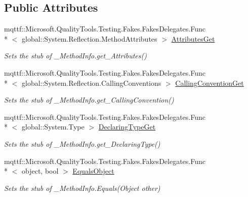 \subsection*{Public Attributes}
\begin{DoxyCompactItemize}
\item 
mqttf\-::\-Microsoft.\-Quality\-Tools.\-Testing.\-Fakes.\-Fakes\-Delegates.\-Func\\*
$<$ global\-::\-System.\-Reflection.\-Method\-Attributes $>$ \hyperlink{class_system_1_1_runtime_1_1_interop_services_1_1_fakes_1_1_stub___method_info_a2adbb44739c05931cddff21cc3cf0a2f}{Attributes\-Get}
\begin{DoxyCompactList}\small\item\em Sets the stub of \-\_\-\-Method\-Info.\-get\-\_\-\-Attributes()\end{DoxyCompactList}\item 
mqttf\-::\-Microsoft.\-Quality\-Tools.\-Testing.\-Fakes.\-Fakes\-Delegates.\-Func\\*
$<$ global\-::\-System.\-Reflection.\-Calling\-Conventions $>$ \hyperlink{class_system_1_1_runtime_1_1_interop_services_1_1_fakes_1_1_stub___method_info_a285e22b393af38c032bd43e90f5b8515}{Calling\-Convention\-Get}
\begin{DoxyCompactList}\small\item\em Sets the stub of \-\_\-\-Method\-Info.\-get\-\_\-\-Calling\-Convention()\end{DoxyCompactList}\item 
mqttf\-::\-Microsoft.\-Quality\-Tools.\-Testing.\-Fakes.\-Fakes\-Delegates.\-Func\\*
$<$ global\-::\-System.\-Type $>$ \hyperlink{class_system_1_1_runtime_1_1_interop_services_1_1_fakes_1_1_stub___method_info_a15dfd669737847277b9f55ebc8617d44}{Declaring\-Type\-Get}
\begin{DoxyCompactList}\small\item\em Sets the stub of \-\_\-\-Method\-Info.\-get\-\_\-\-Declaring\-Type()\end{DoxyCompactList}\item 
mqttf\-::\-Microsoft.\-Quality\-Tools.\-Testing.\-Fakes.\-Fakes\-Delegates.\-Func\\*
$<$ object, bool $>$ \hyperlink{class_system_1_1_runtime_1_1_interop_services_1_1_fakes_1_1_stub___method_info_a654e0d69e453b0b703d8944f7be65e88}{Equals\-Object}
\begin{DoxyCompactList}\small\item\em Sets the stub of \-\_\-\-Method\-Info.\-Equals(\-Object other)\end{DoxyCompactList}\item 

\end{DoxyCompactItemize}
